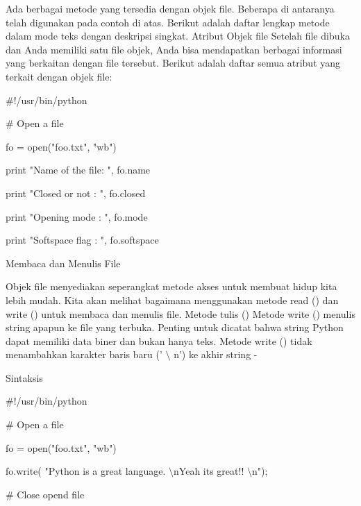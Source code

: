 Ada berbagai metode yang tersedia dengan objek file. Beberapa di antaranya telah digunakan pada contoh di atas. Berikut adalah daftar lengkap metode dalam mode teks dengan deskripsi singkat. Atribut Objek file Setelah file dibuka dan Anda memiliki satu file objek, Anda bisa mendapatkan berbagai informasi yang berkaitan dengan file tersebut. Berikut adalah daftar semua atribut yang terkait dengan objek file: \par
\vspace{12pt}
\vspace{12pt}
\vspace{12pt}
\noindent 
 $  \#  $!/usr/bin/python \par
\vspace{12pt}
\noindent 
 $  \#  $ Open a file \par
\noindent 
fo = open("foo.txt", "wb") \par
\noindent 
print "Name of the file: ", fo.name \par
\noindent 
print "Closed or not : ", fo.closed \par
\noindent 
print "Opening mode : ", fo.mode \par
\noindent 
print "Softspace flag : ", fo.softspace \par
\vspace{12pt}
\noindent 
Membaca dan Menulis File \par
\vspace{12pt}
Objek file menyediakan seperangkat metode akses untuk membuat hidup kita lebih mudah. Kita akan melihat bagaimana menggunakan metode read () dan write () untuk membaca dan menulis file. Metode tulis () Metode write () menulis string apapun ke file yang terbuka. Penting untuk dicatat bahwa string Python dapat memiliki data biner dan bukan hanya teks. Metode write () tidak menambahkan karakter baris baru (' $  \setminus  $ n') ke akhir string - \par
\noindent 
Sintaksis \par
\vspace{12pt}
\noindent 
 $  \#  $!/usr/bin/python \par
\vspace{12pt}
\noindent 
 $  \#  $ Open a file \par
\noindent 
fo = open("foo.txt", "wb") \par
\noindent 
fo.write( "Python is a great language. $  \setminus  $nYeah its great!! $  \setminus  $n"); \par
\vspace{12pt}
\noindent 
 $  \#  $ Close opend file \par

